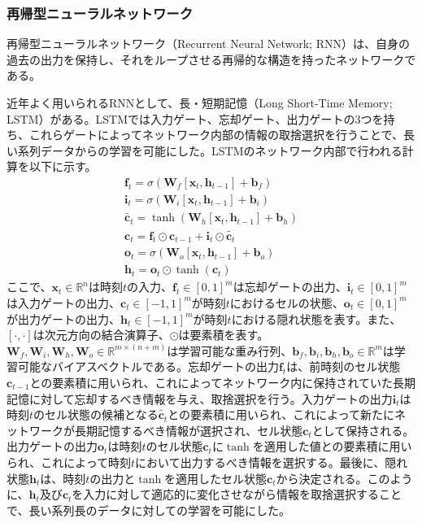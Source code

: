 \documentclass[12pt]{jarticle}
\numberwithin{equation}{section}    %
\numberwithin{figure}{section}      %
\numberwithin{table}{section}      %
\begin{document}
\subsubsection{再帰型ニューラルネットワーク}
再帰型ニューラルネットワーク（Recurrent Neural Network; RNN）は、自身の過去の出力を保持し、それをループさせる再帰的な構造を持ったネットワークである。

近年よく用いられるRNNとして、長・短期記憶（Long Short-Time Memory; LSTM）\cite{hochreiter1997long}がある。LSTMでは入力ゲート、忘却ゲート、出力ゲートの3つを持ち、これらゲートによってネットワーク内部の情報の取捨選択を行うことで、長い系列データからの学習を可能にした。LSTMのネットワーク内部で行われる計算を以下に示す。
\begin{gather}
    \bm{f}_{t} = \sigma(\bm{W}_{f}[\bm{x}_{t}, \bm{h}_{t-1}] + \bm{b}_{f}) \\
    \bm{i}_{t} = \sigma(\bm{W}_{i}[\bm{x}_{t}, \bm{h}_{t-1}] + \bm{b}_{i}) \\
    \tilde{\bm{c}_{t}} = \tanh (\bm{W}_{h}[\bm{x}_{t}, \bm{h}_{t-1}] + \bm{b}_{h}) \\
    \bm{c}_{t} = \bm{f}_{t} \odot \bm{c}_{t-1} + \bm{i}_{t} \odot \tilde{\bm{c}_{t}} \\
    \bm{o}_{t} = \sigma(\bm{W}_{o}[\bm{x}_{t}, \bm{h}_{t-1}] + \bm{b}_{o}) \\
    \bm{h}_{t} = \bm{o}_{t} \odot \tanh(\bm{c}_{t})
\end{gather}
ここで、$\bm{x}_{t} \in \mathbb{R}^{n}$は時刻$t$の入力、$\bm{f}_{t} \in [0, 1]^{m}$は忘却ゲートの出力、$\bm{i}_{t} \in [0, 1]^{m}$は入力ゲートの出力、$\bm{c}_{t} \in [-1, 1]^{m}$が時刻$t$におけるセルの状態、$\bm{o}_{t} \in [0, 1]^{m}$が出力ゲートの出力、$\bm{h}_{t} \in [-1, 1]^{m}$が時刻$t$における隠れ状態を表す。また、$[\cdot, \cdot]$は次元方向の結合演算子、$\odot$は要素積を表す。$\bm{W}_{f}, \bm{W}_{i}, \bm{W}_{h}, \bm{W}_{o} \in \mathbb{R}^{m \times (n + m)}$は学習可能な重み行列、$\bm{b}_{f}, \bm{b}_{i}, \bm{b}_{h}, \bm{b}_{o} \in \mathbb{R}^{m}$は学習可能なバイアスベクトルである。忘却ゲートの出力$\bm{f}_{t}$は、前時刻のセル状態$\bm{c}_{t-1}$との要素積に用いられ、これによってネットワーク内に保持されていた長期記憶に対して忘却するべき情報を与え、取捨選択を行う。入力ゲートの出力$\bm{i}_{t}$は時刻$t$のセル状態の候補となる$\tilde{\bm{c}_{t}}$との要素積に用いられ、これによって新たにネットワークが長期記憶するべき情報が選択され、セル状態$\bm{c}_{t}$として保持される。出力ゲートの出力$\bm{o}_{t}$は時刻$t$のセル状態$\bm{c}_{t}$に$\tanh$を適用した値との要素積に用いられ、これによって時刻$t$において出力するべき情報を選択する。最後に、隠れ状態$\bm{h}_{t}$は、時刻$t$の出力と$\tanh$を適用したセル状態$\bm{c}_{t}$から決定される。このように、$\bm{h}_{t}$及び$\bm{c}_{t}$を入力に対して適応的に変化させながら情報を取捨選択することで、長い系列長のデータに対しての学習を可能にした。
\end{document}
